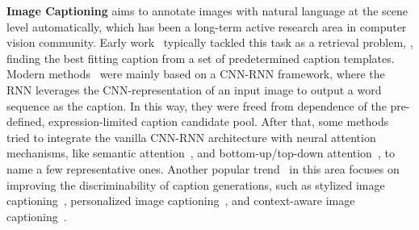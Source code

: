 \documentclass[10pt,twocolumn,letterpaper]{article}
\begin{document}
\noindent\textbf{Image Captioning} aims to annotate images
with natural language at the scene level automatically, which has been a long-term active research area in computer vision community. Early work~\cite{ordonez2011im2text,gong2014improving} typically tackled this task as a retrieval problem, \ie, finding the best fitting caption from a set of predetermined caption templates. Modern methods~\cite{mao2014deep,karpathy2015deep,vinyals2015show} were mainly based on a CNN-RNN framework, where the RNN leverages the CNN-representation of an input image to output a word sequence as the caption. In this way, they were freed from dependence of the pre-defined, expression-limited caption candidate pool. After that, some methods~\cite{xu2015show,Anderson_2018_CVPR,lu2017knowing} tried to integrate the vanilla CNN-RNN architecture with neural attention mechanisms, like semantic attention~\cite{lu2017knowing}, and bottom-up/top-down attention~\cite{Anderson_2018_CVPR}, to name a few representative ones.  Another popular trend~\cite{gan2017,park2017attend,johnson2016densecap,Chen_2018_CVPR,Mathews_2018_CVPR,Luo_2018_CVPR,Chen_2018_ECCV} in this area focuses on improving the discriminability of caption generations, such as stylized image captioning~\cite{gan2017,Chen_2018_ECCV}, personalized image captioning~\cite{park2017attend}, and context-aware image captioning~\cite{johnson2016densecap,Chen_2018_CVPR}.
\end{document}
